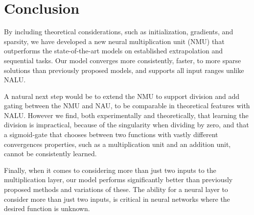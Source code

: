 \section{Conclusion}
By including theoretical considerations, such as initialization, gradients, and sparsity, we have developed a new neural multiplication unit (NMU) that outperforms the state-of-the-art models on established extrapolation and sequential tasks.
Our model converges more consistently, faster, to more sparse solutions than previously proposed models, and supports all input ranges unlike NALU.

A natural next step would be to extend the NMU to support division and add gating between the NMU and NAU, to be comparable in theoretical features with NALU.
However we find, both experimentally and theoretically, that learning the division is impractical, because of the singularity when dividing by zero, and that a sigmoid-gate that chooses between two functions with vastly different convergences properties, such as a multiplication unit and an addition unit, cannot be consistently learned.

Finally, when it comes to considering more than just two inputs to the multiplication layer, our model performs significantly better than previously proposed methods and variations of these.
The ability for a neural layer to consider more than just two inputs, is critical in neural networks where the desired function is unknown.